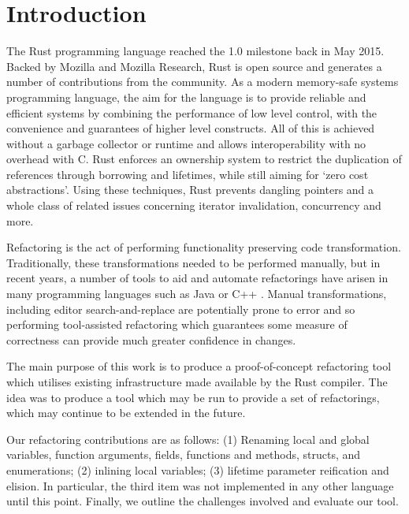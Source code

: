 \section{Introduction}\label{C:intro}

The Rust programming language reached the 1.0 milestone back in May 2015. Backed by Mozilla and Mozilla Research, Rust is open source and generates a number of contributions from the community. As a modern memory-safe systems programming language, the aim for the language is to provide reliable and efficient systems by combining the performance of low level control, with the convenience and guarantees of higher level constructs. All of this is achieved without a garbage collector or runtime and allows interoperability with no overhead with C. Rust enforces an ownership system to restrict the duplication of references through borrowing and lifetimes, while still aiming for `zero cost abstractions'. Using these techniques, Rust prevents dangling pointers and a whole class of related issues concerning iterator invalidation, concurrency and more.

Refactoring is the act of performing functionality preserving code transformation. Traditionally, these transformations needed to be performed manually, but in recent years, a number of tools to aid and automate refactorings have arisen in many programming languages such as Java or C++ \cite{brown2008tool}. Manual transformations, including editor search-and-replace are potentially prone to error and so performing tool-assisted refactoring which guarantees some measure of correctness can provide much greater confidence in changes.

The main purpose of this work is to produce a proof-of-concept refactoring tool which utilises existing infrastructure made available by the Rust compiler. The idea was to produce a tool which may be run to provide a set of refactorings, which may continue to be extended in the future.

Our refactoring contributions are as follows: (1) Renaming local and global variables, function arguments, fields, functions and methods, structs, and enumerations; (2) inlining local variables; (3) lifetime parameter reification and elision. In particular, the third item was not implemented in any other language until this point. Finally, we outline the challenges involved and evaluate our tool.